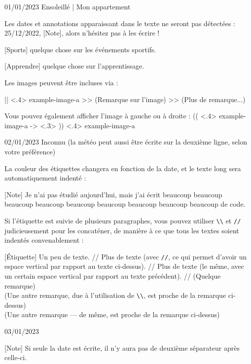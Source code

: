 \documentclass[11pt, paperstyle=light yellow, color entry, day-month-year]{jwjournal}
\begin{document}
01/01/2023 Ensoleillé | Mon appartement

  Les dates et annotations apparaissant dans le texte ne seront pas  détectées : 25/12/2022, [Note], alors n'hésitez pas à les écrire !

  [Sports] quelque chose sur les événements sportifs.

  [Apprendre] quelque chose sur l'apprentissage.

  Les images peuvent être incluses via :

  || <.4> {example-image-a} %
  >> (Remarque sur l'image)
  >> (Plus de remarque...)

  Vous pouvez également afficher l'image à gauche ou à droite :
  (( <.4> {example-image-a} %
  -> <.3> %
  )) <.4> {example-image-a} %



02/01/2023
Inconnu (la météo peut aussi être écrite sur la deuxième ligne, selon votre préférence)

  La couleur des étiquettes changera en fonction de la date, et le texte long sera automatiquement indenté :

  [Note] Je n'ai pas étudié aujourd'hui, mais j'ai écrit beaucoup beaucoup beaucoup beaucoup beaucoup beaucoup beaucoup beaucoup beaucoup de code.

  Si l'étiquette est suivie de plusieurs paragraphes, vous pouvez utiliser \texttt{\textbackslash\textbackslash} et \texttt{\slash\slash} judicieusement pour les concaténer, de manière à ce que tous les textes soient indentés convenablement :

  [Étiquette] Un peu de texte.
    //
    Plus de texte (avec \texttt{\slash\slash}, ce qui permet d'avoir un espace vertical par rapport au texte ci-dessus).
    //
    Plus de texte (le même, avec un certain espace vertical par rapport au texte précédent).
    //
    (Quelque remarque)
    \\
    (Une autre remarque, due à l'utilisation de \texttt{\textbackslash\textbackslash}, est proche de la remarque ci-dessus)
    \\
    (Une autre remarque --- de même, est proche de la remarque ci-dessus)



03/01/2023

  [Note] Si seule la date est écrite, il n'y aura pas de deuxième séparateur après celle-ci.
\end{document}
